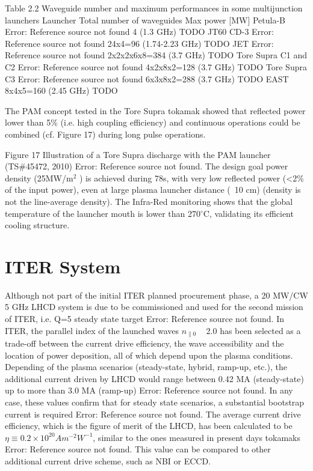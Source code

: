 Table 2.2 Waveguide number and maximum performances in some multijunction launchers 
Launcher
Total number of waveguides
Max power [MW]
Petula-B Error: Reference source not found
4 (1.3 GHz)
TODO
JT60 CD-3 Error: Reference source not found
24x4=96 (1.74-2.23 GHz)
TODO
JET Error: Reference source not found
2x2x2x6x8=384 (3.7 GHz)
TODO
Tore Supra C1 and C2 Error: Reference source not found
4x2x8x2=128 (3.7 GHz)
TODO
Tore Supra C3 Error: Reference source not found
6x3x8x2=288 (3.7 GHz)
TODO
EAST
8x4x5=160 (2.45 GHz)
TODO

The PAM concept tested in the Tore Supra tokamak showed that reflected power lower than 5\% (i.e. high coupling efficiency) and continuous operations could be combined (cf. Figure 17) during long pulse operations. 

Figure 17 Illustration of a Tore Supra discharge with the PAM launcher (TS\#45472, 2010) Error: Reference source not found. The design goal power density (25MW/m$^2$ ) is achieved during 78s, with very low reflected power (<2\% of the input power), even at large plasma launcher distance (~10 cm) (density is not the line-average density). The Infra-Red monitoring shows that the global temperature of the launcher mouth is lower than 270$^{\circ}$C, validating its efficient cooling structure.

\section{ITER System}

Although not part of the initial ITER planned procurement phase, a 20 MW/CW 5 GHz LHCD system is due to be commissioned and used for the second mission of ITER, i.e. Q=5 steady state target Error: Reference source not found. In ITER, the parallel index of the launched waves $n_{\parallel 0}$ ~ 2.0 has been selected as a trade-off between the current drive efficiency, the wave accessibility and the location of power deposition, all of which depend upon the plasma conditions. Depending of the plasma scenarios (steady-state, hybrid, ramp-up, etc.), the additional current driven by LHCD would range between 0.42 MA (steady-state) up to more than 3.0 MA (ramp-up) Error: Reference source not found. In any case, these values confirm that for steady state scenarios, a substantial bootstrap current is required Error: Reference source not found. The average current drive efficiency, which is the figure of merit of the LHCD, has been calculated to be $\eta \equiv 0.2 \times 10^{20} A m^{-2} W^{-1}$, similar to the ones measured in present days tokamaks Error: Reference source not found. This value can be compared to other additional current drive scheme, such as NBI or ECCD. 

